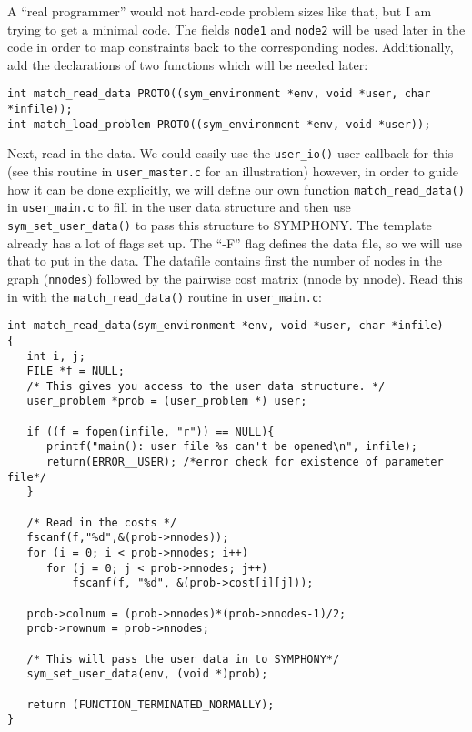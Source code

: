 \documentclass[11pt]{article}
\begin{document}
A ``real programmer'' would not hard-code problem sizes like that, but I am
trying to get a minimal code. The fields \texttt{node1} and \texttt{node2} will
be used later in the code in order to map constraints back to the
corresponding nodes. Additionally, add the declarations of two functions which 
will be needed later: 

\begin{verbatim}
int match_read_data PROTO((sym_environment *env, void *user, char *infile));
int match_load_problem PROTO((sym_environment *env, void *user));
\end{verbatim}

Next, read in the data. We could easily use the \texttt{user\_io()} 
user-callback for this (see this routine in \texttt{user\_master.c} 
for an illustration) however, in order to guide how it can be done 
explicitly, we will define our own function
\texttt{match\_read\_data()} in \texttt{user\_main.c} to fill in the 
user data structure and then use \texttt{sym\_set\_user\_data()} to pass 
this structure to SYMPHONY. The template already has a lot of 
flags set up. The ``-F'' flag defines the data file, so we will use that to 
put in the data. The datafile contains first the number of nodes in the 
graph (\texttt{nnodes}) followed by the pairwise cost matrix (nnode by nnode). 
Read this in with the \texttt{match\_read\_data()} routine in 
\texttt{user\_main.c}:

\begin{verbatim}
int match_read_data(sym_environment *env, void *user, char *infile)
{
   int i, j;
   FILE *f = NULL;
   /* This gives you access to the user data structure. */
   user_problem *prob = (user_problem *) user;

   if ((f = fopen(infile, "r")) == NULL){
      printf("main(): user file %s can't be opened\n", infile);
      return(ERROR__USER); /*error check for existence of parameter file*/
   }

   /* Read in the costs */
   fscanf(f,"%d",&(prob->nnodes));
   for (i = 0; i < prob->nnodes; i++)
      for (j = 0; j < prob->nnodes; j++)
          fscanf(f, "%d", &(prob->cost[i][j]));
   
   prob->colnum = (prob->nnodes)*(prob->nnodes-1)/2;
   prob->rownum = prob->nnodes;

   /* This will pass the user data in to SYMPHONY*/
   sym_set_user_data(env, (void *)prob);

   return (FUNCTION_TERMINATED_NORMALLY);
}
\end{verbatim}   
\end{document}
